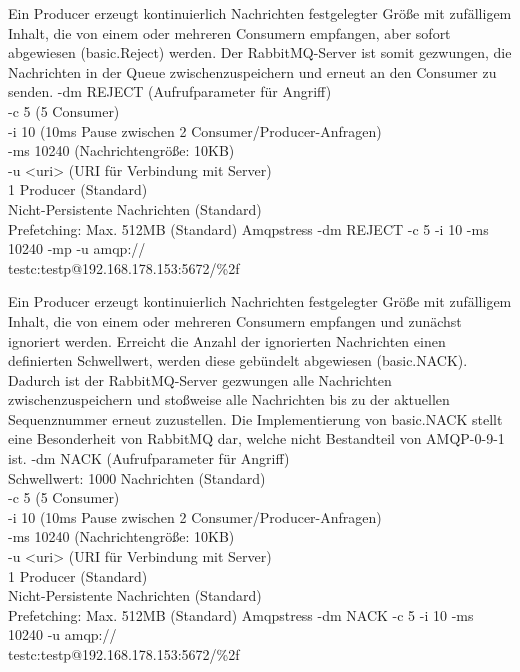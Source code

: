 \documentclass[	a4paper,
			11pt,
			oneside,
			parskip]{scrartcl}
\begin{document}
		{%
		 Ein Producer erzeugt kontinuierlich Nachrichten festgelegter Größe mit zufälligem Inhalt, die von einem oder mehreren Consumern empfangen, aber sofort abgewiesen (basic.Reject) werden.
		 Der RabbitMQ-Server ist somit gezwungen, die Nachrichten in der Queue zwischenzuspeichern und erneut an den Consumer zu senden.
		}{%
		 -dm REJECT (Aufrufparameter für Angriff) \\
		 -c 5 (5 Consumer) \\
		 -i 10 (10ms Pause zwischen 2 Consumer/Producer-Anfragen) \\
		 -ms 10240 (Nachrichtengröße: 10KB) \\
		 -u <uri> (URI für Verbindung mit Server) \\
		 1 Producer (Standard) \\
		 Nicht-Persistente Nachrichten (Standard) \\
		 Prefetching: Max. 512MB (Standard)
		}{%
		 Amqpstress -dm REJECT -c 5 -i 10 -ms 10240 -mp -u amqp://\\\hspace*{3cm}testc:testp@192.168.178.153:5672/\%2f
		}
		
	
		{%
		 Ein Producer erzeugt kontinuierlich Nachrichten festgelegter Größe mit zufälligem Inhalt, die von einem oder mehreren Consumern empfangen und zunächst ignoriert werden. Erreicht die Anzahl der 
		 ignorierten Nachrichten einen definierten Schwellwert, werden diese gebündelt abgewiesen (basic.NACK). Dadurch ist der RabbitMQ-Server gezwungen alle Nachrichten zwischenzuspeichern und stoßweise alle Nachrichten bis zu der aktuellen Sequenznummer erneut zuzustellen. Die Implementierung von basic.NACK stellt eine Besonderheit von RabbitMQ dar, welche nicht Bestandteil von AMQP-0-9-1 ist.
		}{%
		 -dm NACK (Aufrufparameter für Angriff) \\
		 Schwellwert: 1000 Nachrichten (Standard) \\
		 -c 5 (5 Consumer) \\
		 -i 10 (10ms Pause zwischen 2 Consumer/Producer-Anfragen) \\
		 -ms 10240 (Nachrichtengröße: 10KB) \\
		 -u <uri> (URI für Verbindung mit Server) \\
		 1 Producer (Standard) \\
		 Nicht-Persistente Nachrichten (Standard) \\
		 Prefetching: Max. 512MB (Standard)
		}{%
		 Amqpstress -dm NACK -c 5 -i 10 -ms 10240 -u amqp://\\\hspace*{3cm}testc:testp@192.168.178.153:5672/\%2f
		}
		
\end{document}
